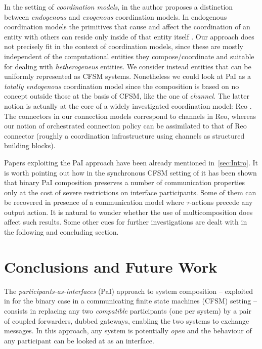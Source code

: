 In the setting of {\em coordination models}, in \cite{Arbab98} the author proposes 
a distinction between {\em endogenous} and {\em exogenous} coordination models.
In endogenous coordination models the primitives that cause and affect the coordination of an
entity with others can reside only inside of that entity itself \cite{Arbab04}.
Our approach does not precisely fit in the context of coordination models,
since these are mostly independent of the computational entities they compose/coordinate
and suitable for dealing with {\em hetherogeneus} entities.
We consider instead entities that can be uniformly represented as CFSM systems.
Nonetheless we could look at PaI as a {\em totally endogenous} coordination model since
the composition is based on no concept outside those at the basis of CFSM,
like the one of {\em channel}. The latter notion is actually at the core of a widely investigated
coordination model: Reo \cite{Arbab04}. 
The connectors in our connection models correspond to channels in Reo, whereas 
our notion of orchestrated connection policy can be assimilated to that of
Reo connector (roughly a coordination infrastructure using channels as structured building blocks).


Papers exploiting the PaI approach have been already mentioned in~\cref{sec:Intro}.
It is worth pointing out how in the synchronous CFSM setting of \cite{BLT23} it has been shown that binary PaI composition preserves a number of communication properties only at the cost of severe
restrictions on interface participants. Some of them can be recovered in presence of a communication
model where $\tau$-actions precede any output action. It is natural to wonder whether
the use of multicomposition does affect such results. Some other cues for further investigations    
are dealt with in the following and concluding section.





\section{Conclusions and Future Work}
\label{sect:conclusions}


The {\em participants-as-interfaces\/} (PaI) approach to system composition -- exploited in
\cite{BdLH19} for the binary case in a  communicating finite state machines (CFSM)  setting -- consists in replacing any two {\em compatible} participants
(one per system)  by a pair of coupled forwarders, dubbed gateways, enabling the
two systems to exchange messages. In this approach, any system is potentially {\em open} and the behaviour of any participant can be looked at as an interface.


